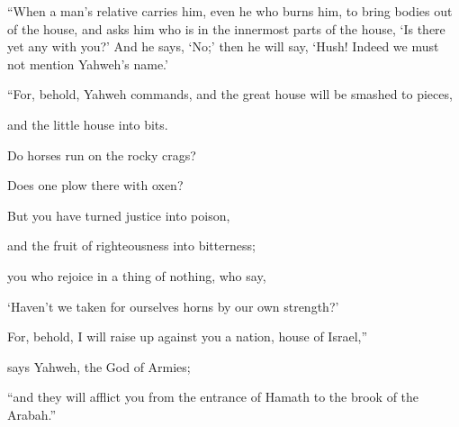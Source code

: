 {\par }{\PP {}“When a man’s relative carries him, even he who burns him, to bring bodies out of the house, and asks him who is in the innermost parts of the house, ‘Is there yet any with you?’ And he says, ‘No;’ then he will say, ‘Hush! Indeed we must not mention Yahweh’s name.’
\par }{\BB \par }{\Q {}“For, behold, Yahweh commands, and the great house will be smashed to pieces,
\par }{\QB and the little house into bits.
\par }{\Q {}Do horses run on the rocky crags?
\par }{\QB Does one plow there with oxen?
\par }{\Q But you have turned justice into poison,
\par }{\QB and the fruit of righteousness into bitterness;
\par }{\Q {}you who rejoice in a thing of nothing, who say,
\par }{\QB ‘Haven’t we taken for ourselves horns by our own strength?’
\par }{\Q {}For, behold, I will raise up against you a nation, house of Israel,”
\par }{\QB says Yahweh, the God of Armies;
\par }{\QB “and they will afflict you from the entrance of Hamath to the brook of the Arabah.”

}
